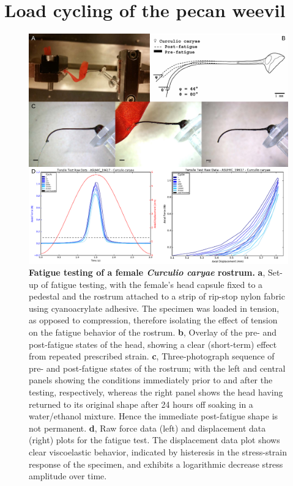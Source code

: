 \documentclass[twocolumn, linenumbers, superscriptaddress, nofootinbib]{revtex4-1}
\begin{document}
	\section{Load cycling of the pecan weevil}
		
		\begin{figure}
			\centering
			\includegraphics[width=180mm]{fig5.pdf}
			\caption{\textbf{Fatigue testing of a female \textit{Curculio caryae} rostrum.}
				\textbf{a}, Set-up of fatigue testing, with the female's head capsule fixed to a pedestal and the rostrum attached to a strip of rip-stop nylon fabric using cyanoacrylate adhesive.
				The specimen was loaded in tension, as opposed to compression, therefore isolating the effect of tension on the fatigue behavior of the rostrum.
				\textbf{b}, Overlay of the pre- and post-fatigue states of the head, showing a clear (short-term) effect from repeated prescribed strain.
				\textbf{c}, Three-photograph sequence of pre- and post-fatigue states of the rostrum; with the left and central panels showing the conditions immediately prior to and after the testing, respectively, whereas the right panel shows the head having returned to its original shape after 24 hours off soaking in a water/ethanol mixture. Hence the immediate post-fatigue shape is not permanent.
				\textbf{d}, Raw force data (left) and displacement data (right) plots for the fatigue test.
				The displacement data plot shows clear viscoelastic behavior, indicated by histeresis in the stress-strain response of the specimen, and exhibits a logarithmic decrease stress amplitude over time.
			}
			\label{fig::fatigue}
		\end{figure}
		
\end{document}
